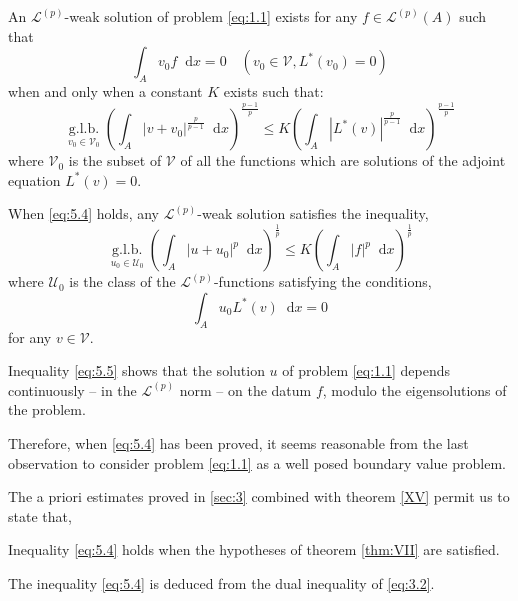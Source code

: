 \documentclass[a4paper,12pt,leqno]{article}
\numberwithin{equation}{section}
\newenvironment{thm}[1]
{\renewcommand\theinnerproblem{#1}\innerproblem}
{\endinnerproblem}
\newcommand{\dd}{\mathop{}\!\mathrm{d}}
\begin{document}
\begin{thm}{XVI}
	An $\mathscr{L}^{(p)}$-weak solution of problem \eqref{eq:1.1} exists for any
	$f \in \mathscr{L}^{(p)}(A)$ such that
	\begin{equation*}
		\int_{A} v_{0} f \dd x=0 \quad
		\left(v_{0} \in \mathscr{V}, L^{*}\left(v_{0}\right)=0\right)
	\end{equation*}
	when and only when a constant $K$ exists such that:
	\begin{equation}
		\label{eq:5.4}
		\underset{v_0 \in \mathscr{V}_0}{\operatorname{g.l.b.}}
		\left(\int_{A} |v+v_{0}|^{\frac{p}{p-1}} \dd x\right)^{\frac{p-1}{p}} \leq K\left(\int_{A}\left|L^{*}(v)\right|^{\frac{p}{p-1}} \dd x\right)^{\frac{p-1}{p}}
	\end{equation}
	where $\mathscr{V}_{0}$ is the subset of $\mathscr{V}$ of all the functions which are solutions of the adjoint equation $L^{*}(v)=0$.
	
	When \eqref{eq:5.4} holds, any $\mathscr{L}^{(p)}$-weak solution satisfies the inequality,
	\begin{equation}
		\label{eq:5.5}
		\underset{u_0 \in \mathscr{U}_0}{\operatorname{g.l.b.}}
		\left(\int_{A} |u+u_{0}|^p \dd x\right)^{\frac{1}{p}} \leq K\left(\int_{A}|f|^{p} \dd x\right)^{\frac{1}{p}}
	\end{equation}
	where $\mathscr{U}_{0}$ is the class of the $\mathscr{L}^{(p)}$-functions satisfying the conditions,
	\begin{equation*}
		\int_{A} u_{0} L^{*}(v) \dd x=0
	\end{equation*}
	for any $v \in \mathscr{V}$.
\end{thm}

Inequality \eqref{eq:5.5} shows that the solution $u$ of problem \eqref{eq:1.1} depends continuously -- in the $\mathscr{L}^{(p)}$ norm -- on the datum $f$, modulo the eigensolutions of the problem.

Therefore, when \eqref{eq:5.4} has been proved, it seems reasonable from the last observation to consider problem \eqref{eq:1.1} as a well posed boundary value problem.

The a priori estimates proved in \cref{sec:3} combined with theorem \ref{XV} permit us to state that,

\begin{thm}{XVII}
	Inequality \eqref{eq:5.4} holds when the hypotheses of theorem \ref{thm:VII} are satisfied.
\end{thm}

The inequality \eqref{eq:5.4} is deduced from the dual inequality of \eqref{eq:3.2}.
\end{document}
